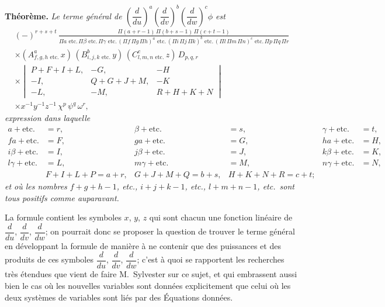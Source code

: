 \documentclass[11pt,a4paper]{book}
\begin{document}
\textbf{Th\'{e}or\`{e}me.} \textit{Le terme g\'{e}n\'{e}ral de $\left(\dfrac{d}{du}\right)^a\left(\dfrac{d}{dv}\right)^b\left(\dfrac{d}{dw}\right)^c\phi$ est}
\begin{multline*}
(-)^{r+s+t}\,\frac{\Pi(a+r-1)\,\Pi(b+s-1)\,\Pi(c+t-1)}{\Pi a\text{ etc.}\,\Pi\beta\text{ etc.}\,\Pi\gamma\text{ etc.}\,(\Pi f\,\Pi g\,\Pi h)^a\text{ etc.}\,(\Pi i\,\Pi j\,\Pi k)^b\text{ etc.}\,(\Pi l\,\Pi m\,\Pi n)^c\text{ etc.}\,\Pi p\,\Pi q\,\Pi r}\\
\times(A^a_{f,g,h\text{ etc.}}\,x)\,(B^b_{i,j,k\text{ etc.}}\,y)\,(C^c_{l,m,n\text{ etc.}}\,z)\,D_{p,q,r}\\
\times\begin{vmatrix}
P+F+I+L, & -G, & -H\\
-I, & Q+G+J+M, & -K\\
-L, & -M, & R+H+K+N
\end{vmatrix}\\
\times x^{-1}y^{-1}z^{-1}\,\chi^p\,\psi^q\,\omega^r,
\end{multline*}
\textit{expression dans laquelle}
\begin{align*}
a+\text{etc.}&=r, & \beta+\text{etc.}&=s, & \gamma+\text{etc.}&=t,\\
fa+\text{etc.}&=F, & ga+\text{etc.}&=G, & ha+\text{etc.}&=H,\\
i\beta+\text{etc.}&=I, & j\beta+\text{etc.}&=J, & k\beta+\text{etc.}&=K,\\
l\gamma+\text{etc.}&=L, & m\gamma+\text{etc.}&=M, & n\gamma+\text{etc.}&=N,\\
&F+I+L+P=a+r, & G+J+M+Q=b+s, & H+K+N+R=c+t;
\end{align*}
\textit{et o\`{u} les nombres $f+g+h-1$, etc., $i+j+k-1$, etc., $l+m+n-1$, etc.\ sont tous positifs comme auparavant.}

La formule contient les symboles $x$, $y$, $z$ qui sont chacun une fonction lin\'{e}aire de $\dfrac{d}{du}$, $\dfrac{d}{dv}$, $\dfrac{d}{dw}$; on pourrait donc se proposer la question de trouver le terme g\'{e}n\'{e}ral en d\'{e}veloppant la formule de mani\`{e}re \`{a} ne contenir que des puissances et des produits de ces symboles $\dfrac{d}{du}$, $\dfrac{d}{dv}$, $\dfrac{d}{dw}$; c'est \`{a} quoi se rapportent les recherches tr\`{e}s \'{e}tendues que vient de faire M.~Sylvester sur ce sujet, et qui embrassent aussi bien le cas o\`{u} les nouvelles variables sont donn\'{e}es explicitement que celui o\`{u} les deux syst\`{e}mes de variables sont li\'{e}s par des \'{E}quations donn\'{e}es.
\end{document}
